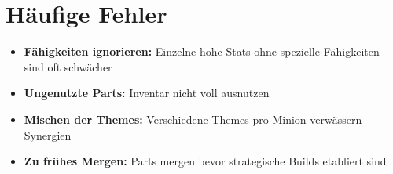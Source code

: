 \documentclass[12pt,a4paper]{article}
\begin{document}
\section{Häufige Fehler}

\begin{itemize}
    \item \textbf{Fähigkeiten ignorieren:} Einzelne hohe Stats ohne spezielle Fähigkeiten sind oft schwächer
    \item \textbf{Ungenutzte Parts:} Inventar nicht voll ausnutzen
    \item \textbf{Mischen der Themes:} Verschiedene Themes pro Minion verwässern Synergien
    \item \textbf{Zu frühes Mergen:} Parts mergen bevor strategische Builds etabliert sind
\end{itemize}
\end{document}
